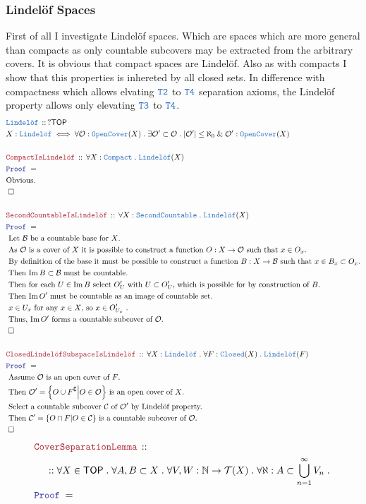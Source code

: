 \documentclass[12pt]{scrartcl}
\newcommand{\TYPE}[1]{\textcolor{NavyBlue}{\mathtt{#1}}}
\newcommand{\LOGIC}[1]{\textcolor{Blue}{\mathtt{#1}}}
\newcommand{\THM}[1]{\textcolor{Maroon}{\mathtt{#1}}}
\renewcommand{\.}{\; . \;}
\newcommand{\Theorem}[2]{& \THM{#1} \, :: \, #2 \\ & \Proof = \\ }
\newcommand{\DeclareType}[2]{& \TYPE{#1} \, :: \, #2 \\}
\newcommand{\DefineType}[3]{& #1 : \TYPE{#2} \iff #3 \\}
\newcommand{\NewLine}{\\ & \kern 1pc}
\newcommand{\Page}[1]{ \begin{align*} #1 \end{align*}   }
\newcommand{\Explain}[1]{& \text{#1.} \\}
\renewcommand{\And}{\; \& \;}
\newcommand{\Nat}{\mathbb{N} }
\DeclareMathOperator*{\im}{Im}
\renewcommand{\c}{\complement}
\newcommand{\QED}{\; \square}
\newcommand{\EndProof}{& \QED \\}
\newcommand{\Proof}{\LOGIC{Proof} \; }
\newcommand{\C}{\mathcal{C}}
\newcommand{\B}{\mathcal{B}}
\newcommand{\Closed}{\TYPE{Closed}}
\newcommand{\Compact}{\TYPE{Compact}}
\newcommand{\Lindelof}{\TYPE{Lindel\ddot{o}f}}
\newcommand{\TOP}{\mathsf{TOP}}
\newcommand{\T}{\mathcal{T}}
\renewcommand{\O}{\mathcal{O}}
\begin{document}
\subsubsection{Lindel\"of Spaces}
First of all I investigate Lindel\"of spaces. 
Which are spaces which are more general than compacts as only countable
subcovers may be extracted from the arbitrary covers. It is obvious that compact spaces are Lindel\"of.
Also as with compacts I show that this properties is inhereted by all closed sets. In difference with compactness which allows elvating $\TYPE{T2}$ to $\TYPE{T4}$ separation axioms, the Lindel\"of property allows only elevating $\TYPE{T3}$ to $\TYPE{T4}$.
\Page{   
	\DeclareType{Lindel\ddot{o}f}
	{
		?\TOP
	}
	\DefineType{X}{Lindel\ddot{o}f}
	{
		\forall \mathcal{O} : \TYPE{OpenCover}(X) \. 
		\exists \mathcal{O}' \subset \mathcal{O} \.
		|\mathcal{O}'| \le \aleph_0 \And \mathcal{O}' : \TYPE{OpenCover}(X)
	}
	\\
	\Theorem{CompactIsLindel\ddot{o}f}
	{
		\forall X : \Compact \. \Lindelof(X)
	}
	\Explain{Obvious}
	\EndProof
	\\
	\Theorem{SecondCountableIsLindel\ddot{o}f}
	{
		\forall X : \TYPE{SecondCountable} \.
		\Lindelof(X)
	}
	\Explain{ 
		Let $\B$ be a countable base for $X$}
	\Explain{
		As $\O$ is a cover of $X$ it is possible to construct a function
		$O : X \to \O$ such that $x \in O_x$}
	\Explain{
		By definition of the base it must be possible to construct a function
	    $B : X \to \B$ such that $x \in B_x \subset O_x$}
	\Explain{
		Then $\im B \subset \B$ must be countable}
	\Explain{
		Then  for each $U \in \im B$ select $O'_U$ with $U \subset O'_U$,
		which is possible for by construction of $B$}
	\Explain{
		Then $\im O'$ must be countable as an image of countable set}
	\Explain{
		$x \in U_x$ for any $x \in X$, so 
		$x \in O'_{U_x}$
	}
	\Explain{
		Thus, $\im O'$ forms a countable subcover of $\O$}
	\EndProof
	\\
	\Theorem{
		ClosedLindel\ddot{o}fSubspaceIsLindel\ddot{o}f
	}
	{
		\forall X : \Lindelof \.
		\forall F : \Closed(X) \.
		\Lindelof(F)
	}
	\Explain{
		Assume $\O$ is an open cover of $F$}
	\Explain{
		Then $\O'= \Big\{O\cup F^\c \Big|O \in \O \Big\}$ is an open cover of $X$}
	\Explain{
		Select a countable subcover $\C$ of $\O'$ by Lindel\"of property}
	\Explain{
		Then $\C' = \{ O \cap F  | O \in \C \}$ is a countable subcover of $\O$}
	\EndProof
}\Page{
	\Theorem{CoverSeparationLemma}
	{
		\NewLine ::		
		\forall X \in \TOP \.
		\forall A,B  \subset X \.
		\forall V,W : \Nat \to \T(X) \.
		\forall \aleph :  A \subset \bigcup^\infty_{n=1} V_n \.
}}
\end{document}
